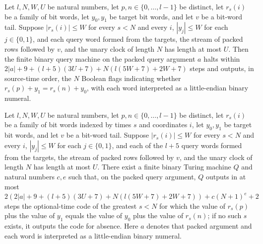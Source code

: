 \begin{lemma}
\label{Complexity.clQueryFlags_compute}
\leanok
{}
Let $l,N,W,U$ be natural numbers, let $p,n\in\{0,\ldots,l-1\}$ be distinct, let $r_s(i)$
be a family of bit words, let $y_0,y_1$ be target bit words, and let $v$ be a bit-word
tail. Suppose $|r_s(i)|\le W$ for every $s<N$ and every $i$, $|y_j|\le W$ for each
$j\in\{0,1\}$, and each query word formed from the targets, the stream of packed rows
followed by $v$, and the unary clock of length $N$ has length at most $U$. Then the
finite binary query machine on the packed query argument $a$ halts within
$2|a|+9+(l+5)(3U+7)+N(l(5W+7)+2W+7)$ steps and outputs, in source-time order, the $N$
Boolean flags indicating whether $r_s(p)+y_1=r_s(n)+y_0$, with each word interpreted as
a little-endian binary numeral.
\end{lemma}

\begin{lemma}
\label{Complexity.clQueryCode_machine}
\leanok
{}
Let $l,N,W,U$ be natural numbers, let $p,n\in\{0,\ldots,l-1\}$ be distinct, let $r_s(i)$
be a family of bit words indexed by times $s$ and coordinates $i$, let $y_0,y_1$ be
target bit words, and let $v$ be a bit-word tail. Suppose $|r_s(i)|\le W$ for every
$s<N$ and every $i$, $|y_j|\le W$ for each $j\in\{0,1\}$, and each of the $l+5$ query
words formed from the targets, the stream of packed rows followed by $v$, and the unary
clock of length $N$ has length at most $U$. There exist a finite binary Turing machine
$Q$ and natural numbers $c,e$ such that, on the packed query argument, $Q$ outputs in at
most $2(2|a|+9+(l+5)(3U+7)+N(l(5W+7)+2W+7))+c(N+1)^e+2$ steps the optional-time code of
the greatest $s<N$ for which the value of $r_s(p)$ plus the value of $y_1$ equals the
value of $y_0$ plus the value of $r_s(n)$; if no such $s$ exists, it outputs the code
for absence. Here $a$ denotes that packed argument and each word is interpreted as a
little-endian binary numeral.
\end{lemma}

